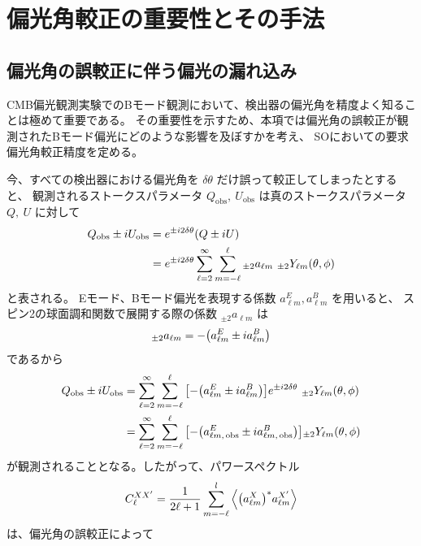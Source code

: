 \documentclass[../../main.tex]{subfiles}
\begin{document}
\section{偏光角較正の重要性とその手法}
\subsection{偏光角の誤較正に伴う偏光の漏れ込み}
CMB偏光観測実験でのBモード観測において、検出器の偏光角を精度よく知ることは極めて重要である。
その重要性を示すため、本項では偏光角の誤較正が観測されたBモード偏光にどのような影響を及ぼすかを考え、
SOにおいての要求偏光角較正精度を定める。

今、すべての検出器における偏光角を $\delta \theta$ だけ誤って較正してしまったとすると、
観測されるストークスパラメータ $Q_{\mathrm{obs}},\ U_{\mathrm{obs}}$ は真のストークスパラメータ $Q,\ U$ に対して
\begin{align}
    Q_{\mathrm{obs}} \pm iU_{\mathrm{obs}} &= e^{\pm i2\delta\theta}\qty(Q \pm iU) \\
    &= e^{\pm i2\delta\theta}\sum_{\ell=2}^{\infty}\sum_{m=-\ell}^{\ell} {}_{\pm 2}a_{\ell m}\ {}_{\pm 2}Y_{\ell m}(\theta, \phi)
\end{align}
と表される。\cite{so:Keating_2013}\cite{so:Kaufman_2014}
Eモード、Bモード偏光を表現する係数 $a_{\ell m}^{E}, a_{\ell m}^{B}$ を用いると、
スピン2の球面調和関数で展開する際の係数 ${}_{\pm 2}a_{\ell m}$ は
\begin{equation}
    {}_{\pm 2}a_{\ell m} = -\qty(a_{\ell m}^{E} \pm i a_{\ell m}^{B})
\end{equation}
であるから
\begin{align}
    Q_{\mathrm{obs}} \pm iU_{\mathrm{obs}} &= \sum_{\ell=2}^{\infty}\sum_{m=-\ell}^{\ell} \qty[-\qty(a_{\ell m}^{E} \pm i a_{\ell m}^{B})]e^{\pm i2\delta\theta}\ {}_{\pm 2}Y_{\ell m}(\theta, \phi) \\
    &= \sum_{\ell=2}^{\infty}\sum_{m=-\ell}^{\ell} \qty[-\qty(a_{\ell m,\,\mathrm{obs}}^{E} \pm i a_{\ell m,\,\mathrm{obs}}^{B})] {}_{\pm2}Y_{\ell m}(\theta, \phi)
\end{align}
が観測されることとなる。したがって、パワースペクトル
\begin{equation}
    C_{\ell}^{XX'} = \dfrac{1}{2\ell+1}\sum_{m=-\ell}^{l}\left\langle \qty(a_{\ell m}^{X})^{*} a_{\ell m}^{X'} \right\rangle
\end{equation}
は、偏光角の誤較正によって
\end{document}

